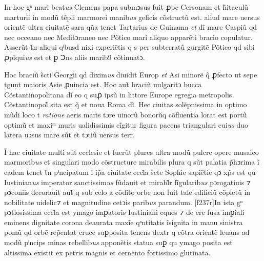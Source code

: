\documentclass[12pt, a4paper]{book}
\newcommand{\styleabbr}[1]{\textit{#1}}
\begin{document}
	\pend
	
				
	\pstart
	
In hoc gᵒ mari beat\styleabbr{us} Clemens papa submↄsus fuit ꝓpe
Cersonam et h̃itaculũ marturii in modũ tẽpli marmorei
manib\styleabbr{us} \styleabbr{}gelicis cõstructũ est. aliud
mare uersus orientẽ ultra ciuitatẽ sara qũa tenet Tartarius de
Guinama \styleabbr{et} dĩ mare Caspiũ qd nec occeano nec
Meditↄraneo nec Põtico mari aliquo apparẽti bracio copulatur.
Asserũt t̃n aliqui qⁱbusd\styleabbr{} nixi experiẽtis q s per
subterratũ gurgitẽ Põtico qd sibi ꝓpĩqui\styleabbr{us} est et ꝑ
Ↄns aliis marib9 cõtinuatↄ.
				
	\pend
	
				
	\pstart
	
Hoc braciũ s̃cti Georgii qd dixim\styleabbr{us} diuidit
Europ\styleabbr{} \styleabbr{et} Asi\styleabbr{} minorẽ q̃
ꝓfecto ut sepe t\styleabbr{}gunt maioris Asie ꝓuincia est. Hoc
aut̃ braciũ uulgaritↄ bucca Cõstantinopolitana dĩ eo q suꝓ ipsũ
in littore Europe egregia metropolis Cõstantinopol̃ sita est q̃
et noua Roma dĩ. Hec ciuitas solẽpnissima in optimo mũdi loco
t\styleabbr{} \styleabbr{ratione} aeris maris tↄre uinorũ
bonorŭq cõfluentia lorat est portũ optimũ et maxiᵐ muris
ualidissimis cĩgitur figura pacens triangulari cui\styleabbr{us}
duo latera uↄsus mare sũt et tↄtiũ uersus terr\styleabbr{}.
				
	\pend
	
				
	\pstart
	
Ĩ hac ciuitate multi sũt ecclesie et fuerũt plures ultra modũ
pulcre opere musaico marmorib\styleabbr{us} et singulari modo
cõstructure mirabilis plura q sũt palatia p̃hↄrima ĩ eadem tenet
t̃n pⁱncipatum ĩ ip̃a ciuitate eccl̃a s̃cte Sophie sapiẽtie qↄ
xp̃s est qu\styleabbr{} Iustinian\styleabbr{us} imperator
sanctissim\styleabbr{us} fũdauit et mirabl̃r
fĩgularib\styleabbr{us} pↄrogatiuis ⁊ pↄconiis decorauit aut̃ q
sub celo a cõdito orbe non fuit tale edificiũ cõpletũ in
nobilitate uidelic⁊ et magnitudine cetↄis parib\styleabbr{us}
parandum. [f237r]In ista gᵒ pↄtiosissima eccl̃a est ymago
imꝑatoris Iustiniani eques ⁊ de ere fusa imꝑiali eminens
dignitate corona deaurata maxĩe qᵃntitatis ĩsignita in manu
sinistra pomũ qd orbẽ rep̃entat cruce suꝑposita tenens
dextr\styleabbr{} q cõtra orientẽ leuans ad modũ pⁱncips minas
rebellib\styleabbr{us} apponẽtis statua suꝑ qu\styleabbr{} ymago
posita est altissima existit ex petris magnis et cernento
fortissimo glutinata.
				
	\pend
	
				
			
		
	

\endnumbering 
\end{document}
